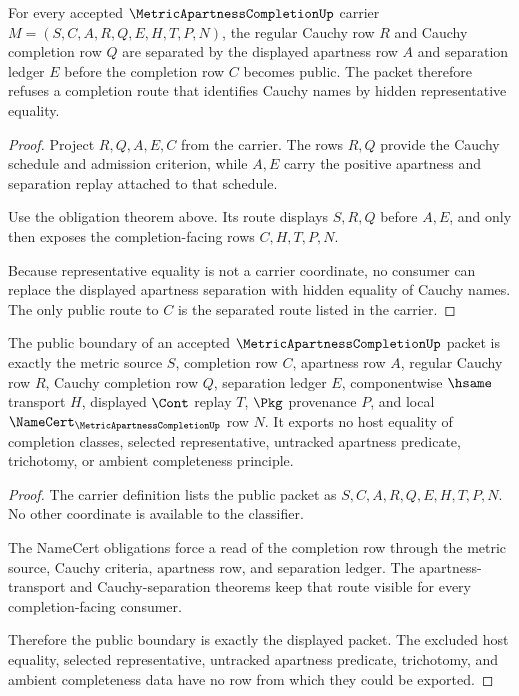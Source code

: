 \begin{theorem}
\label{thm:metric-apartness-completion-cauchy-separation}
For every accepted $\MetricApartnessCompletionUp$ carrier $M=(S,C,A,R,Q,E,H,T,P,N)$, the regular Cauchy row $R$ and Cauchy completion row $Q$ are separated by the displayed apartness row $A$ and separation ledger $E$ before the completion row $C$ becomes public. The packet therefore refuses a completion route that identifies Cauchy names by hidden representative equality.
\end{theorem}
\begin{proof}
Project $R,Q,A,E,C$ from the carrier. The rows $R,Q$ provide the Cauchy schedule and admission criterion, while $A,E$ carry the positive apartness and separation replay attached to that schedule.

Use the obligation theorem above. Its route displays $S,R,Q$ before $A,E$, and only then exposes the completion-facing rows $C,H,T,P,N$.

Because representative equality is not a carrier coordinate, no consumer can replace the displayed apartness separation with hidden equality of Cauchy names. The only public route to $C$ is the separated route listed in the carrier.
\end{proof}

\begin{theorem}
\label{thm:metric-apartness-completion-public-boundary}
The public boundary of an accepted $\MetricApartnessCompletionUp$ packet is exactly the metric source $S$, completion row $C$, apartness row $A$, regular Cauchy row $R$, Cauchy completion row $Q$, separation ledger $E$, componentwise $\hsame$ transport $H$, displayed $\Cont$ replay $T$, $\Pkg$ provenance $P$, and local $\NameCert_{\MetricApartnessCompletionUp}$ row $N$. It exports no host equality of completion classes, selected representative, untracked apartness predicate, trichotomy, or ambient completeness principle.
\end{theorem}
\begin{proof}
The carrier definition lists the public packet as $S,C,A,R,Q,E,H,T,P,N$. No other coordinate is available to the classifier.

The NameCert obligations force a read of the completion row through the metric source, Cauchy criteria, apartness row, and separation ledger. The apartness-transport and Cauchy-separation theorems keep that route visible for every completion-facing consumer.

Therefore the public boundary is exactly the displayed packet. The excluded host equality, selected representative, untracked apartness predicate, trichotomy, and ambient completeness data have no row from which they could be exported.
\end{proof}

